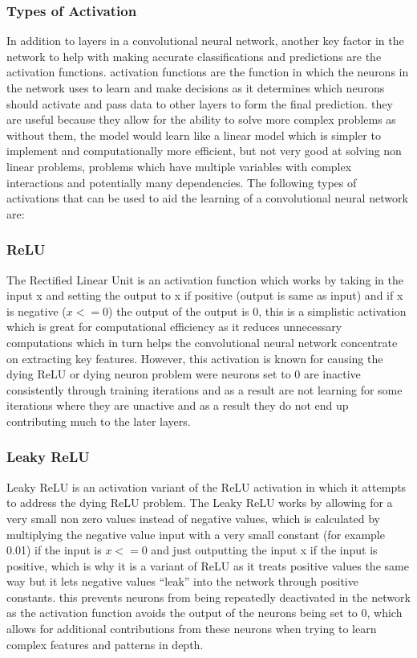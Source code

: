 \documentclass[]{final_report}
\begin{document}
\subsubsection{Types of Activation}

In addition to layers in a convolutional neural network, another key factor in the network to help with making accurate classifications and predictions are the activation functions. activation functions are the function in which the neurons in the network uses to learn and make decisions as it determines which neurons should activate and pass data to other layers to form the final prediction. they are useful because they allow for the ability to solve more complex problems as without them, the model would learn like a linear model which is simpler to implement and computationally more efficient, but not very good at solving non linear problems, problems which have multiple variables with complex interactions and potentially many dependencies. The following types of activations that can be used to aid the learning of a convolutional neural network are:

\subsubsection{ReLU}

The Rectified Linear Unit is an activation function which works by taking in the input x and setting the output to x if positive (output is same as input) and if x is negative ($x<=0$) the output of the output is 0, this is a simplistic activation which is great for computational efficiency as it reduces unnecessary computations which in turn helps the convolutional neural network concentrate on extracting key features. However, this activation is known for causing the dying ReLU or dying neuron problem were neurons set to 0 are inactive consistently through training iterations and as a result are not learning for some iterations where they are unactive and as a result they do not end up contributing much to the later layers. 

\subsubsection{Leaky ReLU}

Leaky ReLU is an activation variant of the ReLU activation in which it attempts to address the dying ReLU problem. The Leaky ReLU works by allowing for a very small non zero values instead of negative values, which is calculated by multiplying the negative value input with a very small constant (for example 0.01) if the input is $x<=0$ and just outputting the input x if the input is positive, which is why it is a variant of ReLU as it treats positive values the same way but it lets negative values “leak” into the network through positive constants. this prevents neurons from being repeatedly deactivated in the network as the activation function avoids the output of the neurons being set to 0, which allows for additional contributions from these neurons when trying to learn complex features and patterns in depth.
\end{document}
